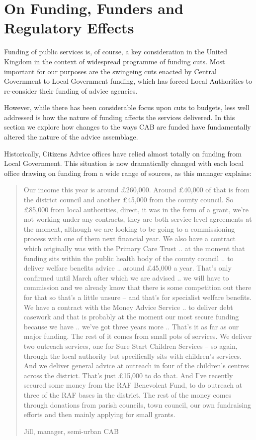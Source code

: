 \section{On Funding, Funders and Regulatory Effects}
Funding of public services is, of course, a key consideration in the United Kingdom in the context of widespread programme of funding cuts. Most important for our purposes are the swingeing cuts enacted by Central Government to Local Government funding, which has forced Local Authorities to re-consider their funding of advice agencies.
\par
However, while there has been considerable focus upon cuts to budgets, less well addressed is how the nature of funding affects the services delivered. In this section we explore how changes to the ways CAB are funded have fundamentally altered the nature of the advice assemblage. 
\par
Historically, Citizens Advice offices have relied almost totally on funding from Local Government. This situation is now dramatically changed with each local office drawing on funding from a wide range of sources, as this manager explains:
    \blockquote[Jill, manager, semi-urban CAB]{Our income this year is around £260,000.  Around £40,000 of that is from the district council and another £45,000 from the county council.  So £85,000 from local authorities, direct, it was in the form of a grant, we’re not working under any contracts, they are both service level agreements at the moment, although we are looking to be going to a commissioning process with one of them next financial year.  We also have a contract which originally was with the Primary Care Trust .. at the moment that funding sits within the public health body of the county council .. to deliver welfare benefits advice .. around £45,000 a year.  That’s only confirmed until March after which we are advised .. we will have to commission and we already know that there is some competition out there for that so that’s a little unsure – and that’s for specialist welfare benefits.  We have a contract with the Money Advice Service .. to deliver debt casework and that is probably at the moment our most secure funding because we have .. we’ve got three years more .. That’s it as far as our major funding.  The rest of it comes from small pots of services. We deliver two outreach services, one for Sure Start Children Services – so again, through the local authority but specifically sits with children’s services.  And we deliver general advice at outreach in four of the children’s centres across the district.  That’s just £15,000 to do that.  And I’ve recently secured some money from the RAF Benevolent Fund, to do outreach at three of the RAF bases in the district.  The rest of the money comes through donations from parish councils, town council, our own fundraising efforts and then mainly applying for small grants.}
